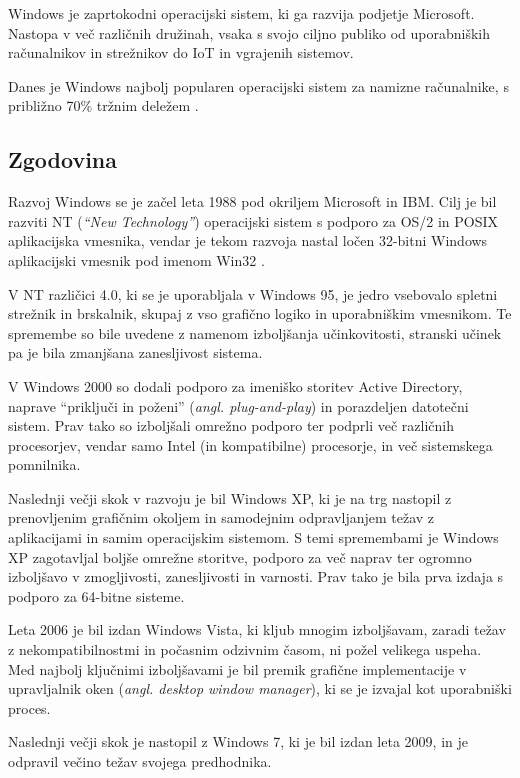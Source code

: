\documentclass[a4paper,12pt,openright]{book}
\begin{document}
Windows je zaprtokodni operacijski sistem, ki ga razvija podjetje Microsoft.
Nastopa v več različnih družinah, vsaka s svojo ciljno publiko od uporabniških računalnikov in strežnikov do IoT in vgrajenih sistemov.

Danes je Windows najbolj popularen operacijski sistem za namizne raču\-nalnike, s približno 70\% tržnim deležem \cite{Statcounter_OS_2024}.

\subsection{Zgodovina}

Razvoj Windows se je začel leta 1988 pod okriljem Microsoft in IBM.
Cilj je bil razviti NT (\textit{``New Technology''}) operacijski sistem s podporo za OS/2 in POSIX aplikacijska vmesnika, vendar je tekom razvoja nastal ločen 32-bitni Windows aplikacijski vmesnik pod imenom Win32 \cite{Silberschatz_Galvin_Gagne_2018}.

V NT različici 4.0, ki se je uporabljala v Windows 95, je jedro vsebovalo spletni strežnik in brskalnik, skupaj z vso grafično logiko in uporabniškim vmesnikom.
Te spremembe so bile uvedene z namenom izboljšanja učinkovitosti, stranski učinek pa je bila zmanjšana zanesljivost sistema.

V Windows 2000 so dodali podporo za imeniško storitev Active Directory, naprave ``priključi in poženi'' (\textit{angl. plug-and-play}) in porazdeljen datotečni sistem.
Prav tako so izboljšali omrežno podporo ter podprli več različnih procesorjev, vendar samo Intel (in kompatibilne) procesorje, in več sistemskega pomnilnika.

Naslednji večji skok v razvoju je bil Windows XP, ki je na trg nastopil z prenovljenim grafičnim okoljem in samodejnim odpravljanjem težav z aplikacijami in samim operacijskim sistemom.
S temi spremembami je Windows XP zagotavljal boljše omrežne storitve, podporo za več naprav ter ogromno izboljšavo v zmogljivosti, zanesljivosti in varnosti.
Prav tako je bila prva izdaja s podporo za 64-bitne sisteme.

Leta 2006 je bil izdan Windows Vista, ki kljub mnogim izboljšavam, zaradi težav z nekompatibilnostmi in počasnim odzivnim časom, ni požel velikega uspeha.
Med najbolj ključnimi izboljšavami je bil premik grafične implementacije v upravljalnik oken (\textit{angl. desktop window manager}), ki se je izvajal kot uporabniški proces.

Naslednji večji skok je nastopil z Windows 7, ki je bil izdan leta 2009, in je odpravil večino težav svojega predhodnika.
\end{document}
